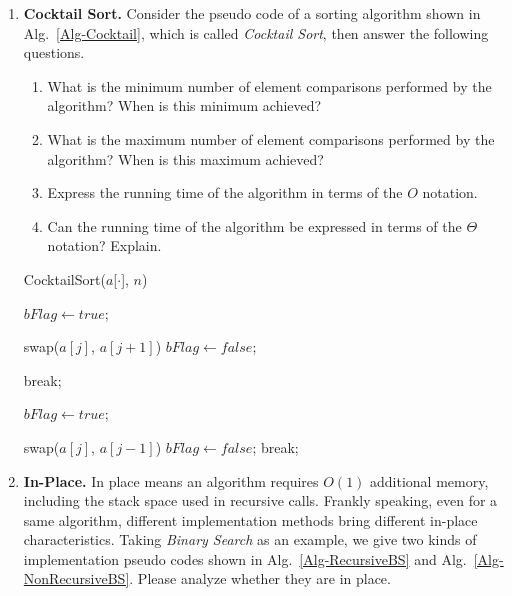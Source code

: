 \documentclass[12pt,a4paper]{article}
\makeatletter
\newtheorem*{solution}{Solution}
\theoremstyle{definition}
\renewenvironment{solution}[1][Solution] {\par\pushQED{\qed}\normalfont\topsep6\p@\@plus6\p@\relax\trivlist\item[\hskip\labelsep\bfseries#1\@addpunct{.}]\ignorespaces}{\popQED\endtrivlist\@endpefalse} \makeatother
\makeatother
\begin{document}
\begin{enumerate}

\item \textbf{Cocktail Sort.} Consider the pseudo code of a sorting algorithm shown in Alg.~\ref{Alg-Cocktail}, which is called \emph{Cocktail Sort}, then answer the following questions.


\begin{minipage}[t]{0.4\textwidth}
\begin{enumerate}
\item What is the minimum number of element comparisons performed by the algorithm? When is this minimum achieved?
\item What is the maximum number of element comparisons performed by the algorithm? When is this maximum achieved?
\item Express the running time of the algorithm in terms of the $O$ notation.
\item Can the running time of the algorithm be expressed in terms of the $\Theta$ notation? Explain.
\end{enumerate}
\end{minipage}
\hspace{2mm}
\begin{minipage}[t]{0.5\textwidth}
\begin{algorithm}[H]
		\caption{CocktailSort($a$[$\cdot$], $n$)} \label{Alg-Cocktail}
		{
			$bFlag \leftarrow true$;
			
			{
				{
					swap($a[j]$, $a[j+1]$)\;
					$bFlag \leftarrow false$;
				}
			}
			
			{
				break;
			}
			
			$bFlag \leftarrow true$;			
			
			{
				{
					swap($a[j]$, $a[j-1]$)\;
					$bFlag \leftarrow false$;
				}
			}
			{
				break;
			}
		}
\end{algorithm}
\end{minipage}


\item \textbf{In-Place.} In place means an algorithm requires $O(1)$ additional memory, including the stack space used in recursive calls. Frankly speaking, even for a same algorithm, different implementation methods bring different in-place characteristics. Taking \emph{Binary Search} as an example, we give two kinds of implementation pseudo codes shown in Alg.~\ref{Alg-RecursiveBS} and Alg.~\ref{Alg-NonRecursiveBS}. Please analyze whether they are in place.
    

\end{enumerate}
\end{document}

